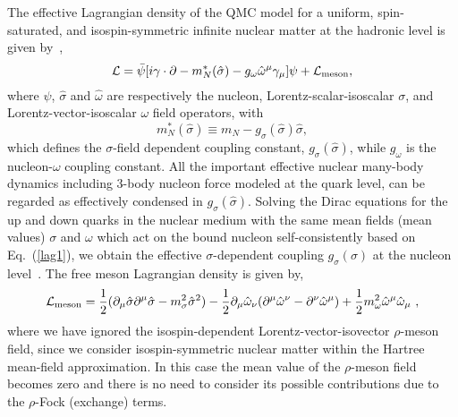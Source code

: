 \documentclass[preprint,aps,showpacs,floatfix]{revtex4}
\begin{document}
The effective Lagrangian density of the QMC model for a uniform, spin-saturated,
and isospin-symmetric infinite nuclear matter 
at the hadronic level is given by~\cite{Guichon,QMCfinite,QMCreview},
%
\begin{equation}
{\cal L} = {\bar \psi} [i\gamma \cdot \partial -m_N^*({\hat \sigma}) -g_\omega {\hat \omega}^\mu \gamma_\mu ] \psi
+ {\cal L}_\textrm{meson} ,
\label{lag1}
\end{equation}
%
where $\psi$, ${\hat \sigma}$ and ${\hat \omega}$ are respectively the nucleon,
Lorentz-scalar-isoscalar $\sigma$, and Lorentz-vector-isoscalar $\omega$ field operators, with
%
\begin{equation}
m_N^*({\hat \sigma}) \equiv m_N - g_\sigma({\hat \sigma}) {\hat \sigma} ,
\label{efnmas}
\end{equation}
%
which defines the $\sigma$-field dependent coupling constant,
$g_\sigma({\hat \sigma})$, while $g_\omega$ is the nucleon-$\omega$ coupling
constant. All the important effective nuclear many-body dynamics including 3-body
nucleon force modeled at the quark level, can be regarded as 
effectively condensed in $g_\sigma({\hat \sigma})$.
Solving the Dirac equations for the up and down quarks in the nuclear medium with
the same mean fields (mean values) $\sigma$ and $\omega$ which act on 
the bound nucleon self-consistently based on Eq.~(\ref{lag1}), 
we obtain the effective $\sigma$-dependent coupling $g_\sigma(\sigma)$
at the nucleon level~\cite{Guichon,QMCfinite,QMCreview}. 
The free meson Lagrangian density is given by,
%
\begin{equation}
{\cal L}_\mathrm{meson} = \frac{1}{2} (\partial_\mu {\hat \sigma} 
\partial^\mu {\hat \sigma} - m_\sigma^2 {\hat \sigma}^2)
- \frac{1}{2} \partial_\mu {\hat \omega}_\nu (\partial^\mu {\hat \omega}^\nu - \partial^\nu {\hat \omega}^\mu)
+ \frac{1}{2} m_\omega^2 {\hat \omega}^\mu {\hat \omega}_\mu \ ,
\label{mlag1}
\end{equation}
%
where we have ignored the isospin-dependent Lorentz-vector-isovector $\rho$-meson field,
since we consider isospin-symmetric nuclear matter within the Hartree mean-field approximation. 
In this case the mean value of the $\rho$-meson field becomes zero and there is
no need to consider its possible contributions due to the $\rho$-Fock (exchange) terms.
\end{document}
